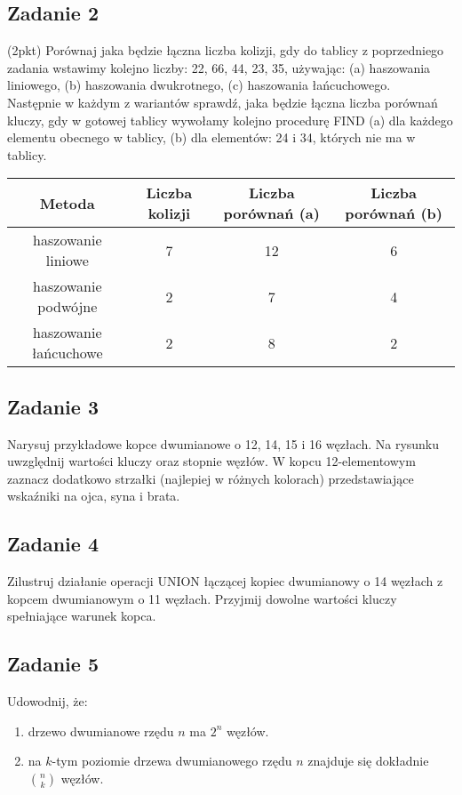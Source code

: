 \documentclass{article}
\begin{document}
\subsection*{Zadanie 2}
(2pkt) Porównaj jaka będzie łączna liczba kolizji, gdy do tablicy z poprzedniego zadania wstawimy kolejno liczby:
22, 66, 44, 23, 35,  używając: (a) haszowania liniowego, (b) haszowania dwukrotnego, (c) haszowania łańcuchowego. \\[1ex]
\noindent
Następnie w każdym z wariantów sprawdź, jaka będzie łączna liczba porównań kluczy, gdy w gotowej tablicy wywołamy
kolejno procedurę FIND (a) dla każdego elementu obecnego w tablicy, (b) dla elementów: 24 i 34, których nie ma w tablicy.
\begin{center}
	\begin{tabular}{c|c|c|c}
		\textbf{Metoda}       & \textbf{Liczba kolizji} & \textbf{Liczba porównań (a)} & \textbf{Liczba porównań (b)} \\
		\hline
		haszowanie liniowe    & 7                       & 12                           & 6                            \\
		haszowanie podwójne   & 2                       & 7                            & 4                            \\
		haszowanie łańcuchowe & 2                       & 8                            & 2
	\end{tabular}
\end{center}

\subsection*{Zadanie 3}
Narysuj przykładowe kopce dwumianowe o 12, 14, 15 i 16 węzłach. Na rysunku uwzględnij wartości kluczy oraz stopnie
węzłów. W kopcu 12-elementowym zaznacz dodatkowo strzałki (najlepiej w różnych kolorach) przedstawiające wskaźniki
na ojca, syna i brata.

\subsection*{Zadanie 4}
Zilustruj działanie operacji UNION łączącej kopiec dwumianowy o 14 węzłach z kopcem
dwumianowym o 11 węzłach. Przyjmij dowolne wartości kluczy spełniające warunek kopca.

\subsection*{Zadanie 5}
Udowodnij, że:
\begin{enumerate}[label=(\alph*)]
	\item drzewo dwumianowe rzędu $n$ ma $2^n$ węzłów.
	\item na $k$-tym poziomie drzewa dwumianowego rzędu $n$ znajduje się dokładnie $n \choose k$ węzłów.
\end{enumerate}
\end{document}

